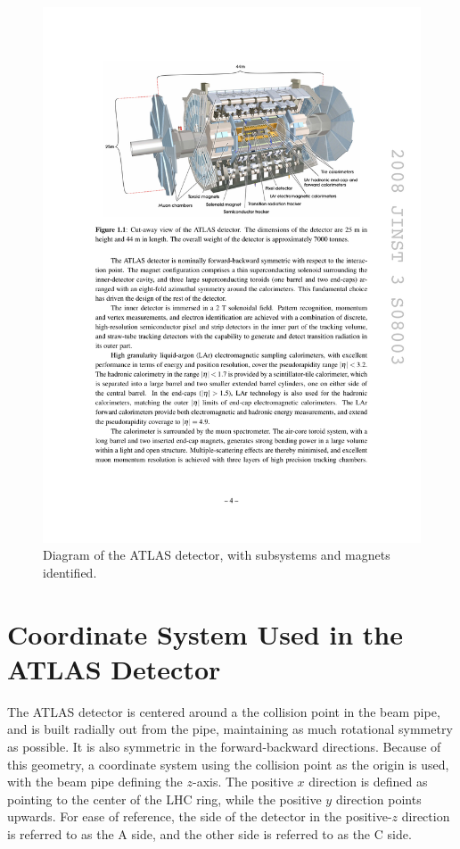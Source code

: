\begin{centering}
\begin{figure}[bth]
\myfloatalign
\includegraphics[width=.90\linewidth]{figures/atlas/detector.pdf}
\caption{Diagram of the ATLAS detector, with subsystems and magnets identified.}
\label{fig:detector}
\end{figure}
\end{centering}

\section{Coordinate System Used in the ATLAS Detector}

The ATLAS detector is centered around a the collision point in the beam pipe, and is built radially out from the pipe, maintaining as much rotational symmetry as possible. It is also symmetric in the forward-backward directions. Because of this geometry, a coordinate system using the collision point as the origin is used, with the beam pipe defining the $z$-axis. The positive $x$ direction is defined as pointing to the center of the \ac{LHC} ring, while the positive $y$ direction points upwards. For ease of reference, the side of the detector in the positive-$z$ direction is referred to as the A side, and the other side is referred to as the C side. 

